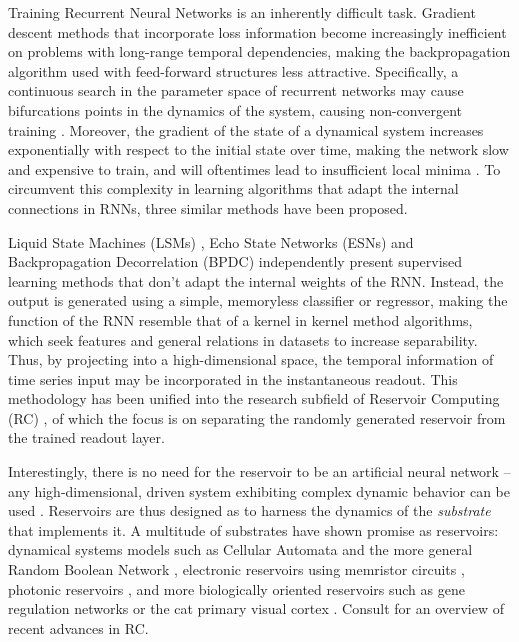 Training Recurrent Neural Networks is an inherently difficult task. Gradient
descent methods that incorporate loss information become increasingly
inefficient on problems with long-range temporal dependencies, making the
backpropagation algorithm used with feed-forward structures less
attractive. Specifically, a continuous search in the parameter space of
recurrent networks may cause bifurcations points in the dynamics of the system,
causing non-convergent training \cite{doya_bifurcations_nodate}. Moreover, the
gradient of the state of a dynamical system increases exponentially with respect
to the initial state over time, making the network slow and expensive to train,
and will oftentimes lead to insufficient local minima
\cite{bengio_learning_1994}. To circumvent this complexity in learning
algorithms that adapt the internal connections in RNNs, three similar methods
have been proposed.

Liquid State Machines (LSMs) \cite{maass_real-time_2002}, Echo State Networks
(ESNs) \cite{jaeger_echo_2001} and Backpropagation Decorrelation (BPDC)
\cite{steil_backpropagation-decorrelation:_2004} independently present
supervised learning methods that don't adapt the internal weights of the
RNN. Instead, the output is generated using a simple, memoryless classifier or
regressor, making the function of the RNN resemble that of a kernel in kernel
method algorithms, which seek features and general relations in datasets to
increase separability. Thus, by projecting into a high-dimensional space, the
temporal information of time series input may be incorporated in the
instantaneous readout. This methodology has been unified into the research
subfield of Reservoir Computing (RC) \cite{schrauwen_overview_2007}, of which
the focus is on separating the randomly generated reservoir from the trained
readout layer.

Interestingly, there is no need for the reservoir to be an artificial neural
network -- any high-dimensional, driven system exhibiting complex dynamic
behavior can be used \cite{schrauwen_overview_2007}. Reservoirs are thus
designed as to harness the dynamics of the \textit{substrate} that implements
it. A multitude of substrates have shown promise as reservoirs: dynamical
systems models such as Cellular Automata \cite{nichele_deep_2017} and the more
general Random Boolean Network \cite{snyder_computational_2013}, electronic
reservoirs using memristor circuits \cite{kulkarni_memristor-based_2012},
photonic reservoirs \cite{vandoorne_experimental_2014}, and more biologically
oriented reservoirs such as gene regulation networks \cite{jones_is_2007} or the
cat primary visual cortex \cite{scholkopf_temporal_2007}. Consult
\cite{tanaka_recent_2018} for an overview of recent advances in RC.

